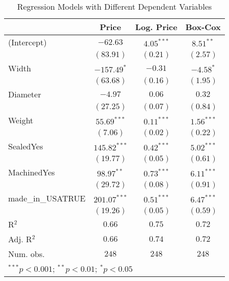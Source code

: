 
\begin{table}
\begin{center}
\begin{tabular}{l c c c}
\hline
 & Price & Log. Price & Box-Cox \\
\hline
(Intercept)       & $-62.63$       & $4.05^{***}$ & $8.51^{**}$  \\
                  & $(83.91)$      & $(0.21)$     & $(2.57)$     \\
Width             & $-157.49^{*}$  & $-0.31$      & $-4.58^{*}$  \\
                  & $(63.68)$      & $(0.16)$     & $(1.95)$     \\
Diameter          & $-4.97$        & $0.06$       & $0.32$       \\
                  & $(27.25)$      & $(0.07)$     & $(0.84)$     \\
Weight            & $55.69^{***}$  & $0.11^{***}$ & $1.56^{***}$ \\
                  & $(7.06)$       & $(0.02)$     & $(0.22)$     \\
SealedYes         & $145.82^{***}$ & $0.42^{***}$ & $5.02^{***}$ \\
                  & $(19.77)$      & $(0.05)$     & $(0.61)$     \\
MachinedYes       & $98.97^{**}$   & $0.73^{***}$ & $6.11^{***}$ \\
                  & $(29.72)$      & $(0.08)$     & $(0.91)$     \\
made\_in\_USATRUE & $201.07^{***}$ & $0.51^{***}$ & $6.47^{***}$ \\
                  & $(19.26)$      & $(0.05)$     & $(0.59)$     \\
\hline
R$^2$             & $0.66$         & $0.75$       & $0.72$       \\
Adj. R$^2$        & $0.66$         & $0.74$       & $0.72$       \\
Num. obs.         & $248$          & $248$        & $248$        \\
\hline
\multicolumn{4}{l}{\scriptsize{$^{***}p<0.001$; $^{**}p<0.01$; $^{*}p<0.05$}}
\end{tabular}
\caption{Regression Models with Different Dependent Variables}
\label{tab:reg_by_dep_var}
\end{center}
\end{table}
